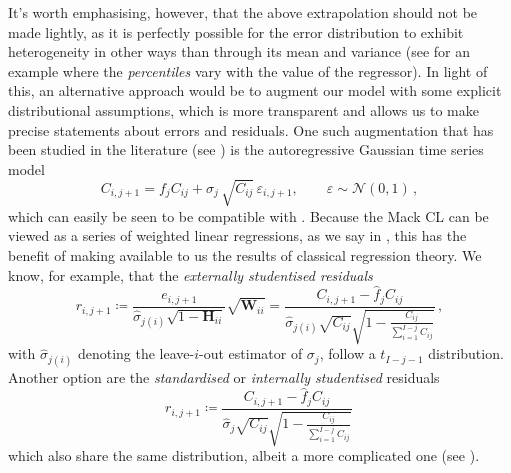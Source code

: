 \documentclass[a4paper]{book}
\begin{document}
It's worth emphasising, however, that the above extrapolation should not be made lightly, as it is perfectly possible for the error distribution to exhibit heterogeneity in other ways than through its mean and variance (see \cite[114]{efron:intro} for an example where the \emph{percentiles} vary with the value of the regressor). In light of this, an alternative approach would be to augment our model with some explicit distributional assumptions, which is more transparent and allows us to make precise statements about errors and residuals. One such augmentation that has been studied in the literature (see \cite[49]{wuthrich:stochastic-reserving}) is the autoregressive Gaussian time series model
\begin{equation} \label{eq:time-series-model}
    C_{i, j + 1} = f_j C_{ij} + \sigma_j \, \sqrt{C_{ij}} \, \varepsilon_{i, j + 1}, \qquad \varepsilon \sim \mathcal{N}(0, 1) \,,
\end{equation}
which can easily be seen to be compatible with . Because the Mack CL can be viewed as a series of weighted linear regressions, as we say in , this has the benefit of making available to us the results of classical regression theory. We know, for example, that the \emph{externally studentised residuals}
\begin{equation}
  r_{i, j + 1} 
  \coloneqq \frac{e_{i, j + 1}}{\widehat{\sigma}_{j (i)} \sqrt{1 - \mathbf{H}_{ii}}} \sqrt{\mathbf{W}_{ii}} 
  = \frac{C_{i, j + 1} - \widehat{f}_j C_{ij}}{\widehat{\sigma}_{j (i)} \sqrt{C_{ij}} \sqrt{1 - \frac{C_{ij}}{\sum_{i = 1}^{I - j} C_{ij}}}} \,,
\end{equation}
with $\widehat{\sigma}_{j (i)}$ denoting the leave-$i$-out estimator of $\sigma_j$, follow a $t_{I - j - 1}$ distribution. Another option are the \emph{standardised} or \emph{internally studentised} residuals
\begin{equation}
  r_{i, j + 1} \coloneqq \frac{C_{i, j + 1} - \widehat{f}_j C_{ij}}{\widehat{\sigma}_j \sqrt{C_{ij}} \sqrt{1 - \frac{C_{ij}}{\sum_{i = 1}^{I - j} C_{ij}}}} \,
\end{equation}
which also share the same distribution, albeit a more complicated one (see \cite[267 \psqq]{seber}). 
\end{document}
